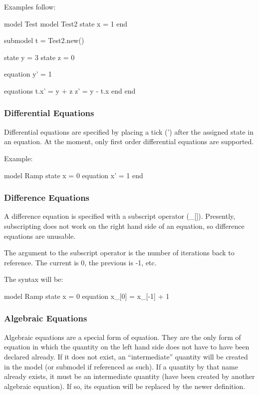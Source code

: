 \documentclass[11pt]{article}
\begin{document}
Examples follow:

\begin{dsl}
model Test
  model Test2
    state x = 1
  end

  submodel t = Test2.new()

  state y = 3
  state z = 0

  equation y' = 1

  equations
    t.x' = y + z
    z' = y - t.x
  end
end
\end{dsl}


\subsubsection{Differential Equations}

Differential equations are specified by placing a tick (') after the
assigned state in an equation.  At the moment, only first order
differential equations are supported.

Example:

\begin{dsl}
model Ramp
  state x = 0
  equation x' = 1
end
\end{dsl}
  

\subsubsection{Difference Equations}

A difference equation is specified with a subscript operator (\_[]).  Presently, subscripting does not work on the right hand side of an equation, so difference equations are unusable.

The argument to the subscript operator is the number of iterations back to reference.  The current is 0, the previous is -1, etc.

The syntax will be:

\begin{dsl}
model Ramp
  state x = 0
  equation x_[0] = x_[-1] + 1
\end{dsl}


\subsubsection{Algebraic Equations}

Algebraic equations are a special form of equation.  They are the only
form of equation in which the quantity on the left hand side does not
have to have been declared already.  If it does not exist, an
``intermediate'' quantity will be created in the model (or submodel if
referenced as such).  If a quantity by that name already exists, it
must be an intermediate quantity (have been created by another
algebraic equation).  If so, its equation will be replaced by the
newer definition.
\end{document}
